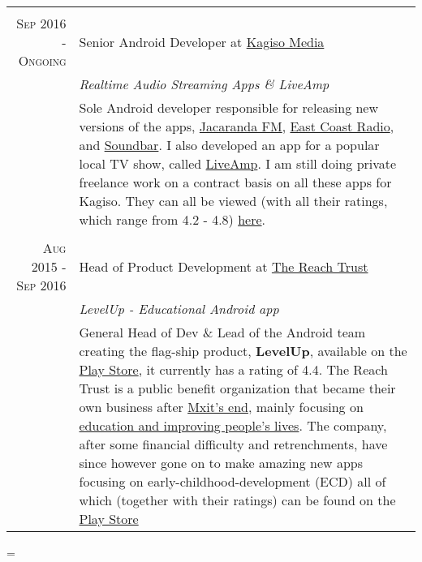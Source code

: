 \documentclass[a4paper,10pt,notitlepage]{article}
\newenvironment{absolutelynopagebreak}
  {\par\nobreak\vfil\penalty0\vfilneg
   \vtop\bgroup}
  {\par\xdef\tpd{\the\prevdepth}\egroup
   \prevdepth=\tpd}
\begin{document}
\begin{absolutelynopagebreak}
\begin{tabular}{r|p{11cm}}
		\multicolumn{2}{c}{} \\
		\textsc{Sep 2016 - Ongoing}  & Senior Android Developer at \href{www.kagisomedia.co.za}{Kagiso Media}                                               \\&\emph{Realtime Audio Streaming Apps \& LiveAmp}\\&\footnotesize{Sole Android developer responsible for releasing new versions of the apps, \href{https://play.google.com/store/apps/details?id=com.kagiso.jacarandafm}{Jacaranda FM},  \href{https://play.google.com/store/apps/details?id=com.kagiso.ecr}{East Coast Radio}, and \href{https://play.google.com/store/apps/details?id=com.kagiso.soundbar}{Soundbar}. I also developed an app for a popular local TV show, called  \href{https://play.google.com/store/apps/details?id=com.kagiso.liveamp}{LiveAmp}. I am still doing private freelance work on a contract basis on all these apps for Kagiso. They can all be viewed (with all their ratings, which range from 4.2 - 4.8) \href{https://play.google.com/store/apps/developer?id=Kagiso+Media}{here}}. \\
		
		\multicolumn{2}{c}{} \\
		\textsc{Aug 2015 - Sep 2016} & Head of Product Development at \href{www.thereachtrust.org}{The Reach Trust} \\                                                                  &\emph{LevelUp -  Educational Android app} \\
		                            &\footnotesize{General Head of Dev \& Lead of the Android team creating the  flag-ship product, \textbf{LevelUp}, available on the \href{https://play.google.com/store/apps/details?id=org.mylevelup}{Play Store}, it currently has a rating of 4.4. The Reach Trust is a public benefit organization that became their own business after \href{https://memeburn.com/2015/10/mxit-confirms-its-shutting-up-shop/}{Mxit's end}, mainly focusing on \href{https://it-online.co.za/2015/10/26/reach-trust-will-use-mxit-for-education/}{education and improving people's lives}. The company, after some financial difficulty and retrenchments, have since however gone on to make amazing new apps focusing on early-childhood-development (ECD) all of which (together with their ratings) can be found on the \href{https://play.google.com/store/apps/dev?id=7356513661681471434}{Play Store}} \\
		 

\end{tabular}
\end{absolutelynopagebreak}
\end{document}

